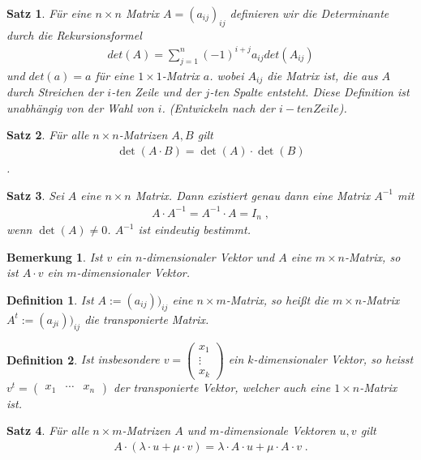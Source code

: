 \documentclass[]{article}
\newtheorem{Definition}{Definition}
\newtheorem{Satz}{Satz}
\newtheorem{Bemerkung}{Bemerkung}
\begin{document}
\begin{Satz}
Für eine $n \times n$ Matrix $A = (a_{ij})_{ij}$ definieren wir die Determinante durch die Rekursionsformel
\begin{align*}
det (A) = \sum_{j=1}^n  (-1)^{i+j} a_{ij} det (A_{ij})
\end{align*}
und $det (a) = a$ für eine $1 \times 1$-Matrix $a$.
wobei $A_{ij}$ die Matrix ist, die aus $A$ durch Streichen der $i$-ten Zeile und der $j$-ten Spalte entsteht.
Diese Definition ist unabhängig von der Wahl von $i$. (Entwickeln nach der $i-ten Zeile$).
\end{Satz}

\begin{Satz}
Für alle $n \times n$-Matrizen $A,B$ gilt
\begin{align*}
\det(A \cdot B) = \det(A) \cdot \det(B)
\end{align*} \; .
\end{Satz}
\begin{Satz}
Sei $A$ eine $n \times n$ Matrix. Dann existiert genau dann eine Matrix $A^{-1}$ mit
\begin{align*}
A \cdot A^{-1}  = A^{-1} \cdot A  = I_n \; ,
\end{align*}
wenn $\det(A) \neq 0$. $A^{-1}$ ist eindeutig bestimmt.
\end{Satz}
\begin{Bemerkung}
Ist $v$ ein $n$-dimensionaler Vektor und $A$ eine $m\times n$-Matrix, so ist 
$A \cdot v$ ein $m$-dimensionaler Vektor.
\end{Bemerkung}

\begin{Definition}
Ist $A := (a_{ij}))_{ij}$ eine $n \times m$-Matrix, so heißt die $m \times n$-Matrix 
$A ^t := (a_{ji}))_{ij}$ die transponierte Matrix. 
\end{Definition}


\begin{Definition}
Ist insbesondere $v= \begin{pmatrix}
x_1 \\ \vdots \\ x_k
\end{pmatrix}
$ ein $k$-dimensionaler Vektor, so heisst
$v^t= \begin{pmatrix}
x_1 & \cdots & x_n
\end{pmatrix}$ der transponierte Vektor, welcher auch eine $1\times n$-Matrix ist.
\end{Definition}

\begin{Satz}
Für alle $n \times m$-Matrizen $A$ und $m$-dimensionale Vektoren $u,v$ gilt
\begin{align*}
A \cdot (\lambda \cdot u + \mu \cdot v) = \lambda \cdot A \cdot u +  \mu  \cdot A \cdot v \; .
\end{align*}
\end{Satz}
\end{document}
